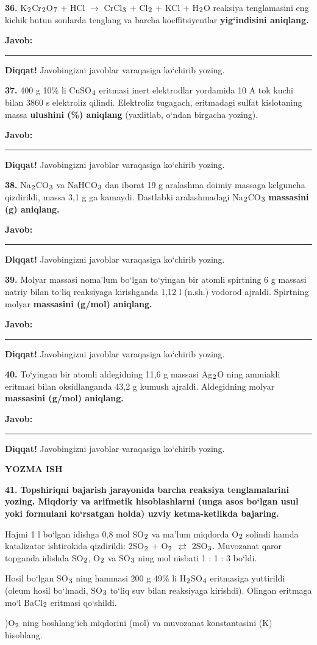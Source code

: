 \documentclass[11pt,a4paper]{article}
\renewcommand{\textsubscript}[1]{\ensuremath{_{\text{\fontsize{8}{8}\selectfont #1}}}}
\newcommand{\javob}{\par\smallskip\noindent\textbf{Javob:} \rule[-2pt]{7.5cm}{0.4pt}\par\smallskip\noindent\textbf{Diqqat!} Javobingizni javoblar varaqasiga ko`chirib yozing.\par\medskip}
\begin{document}
\par\bigskip
\noindent\textbf{36.} K\textsubscript{2}Cr\textsubscript{2}O\textsubscript{7} + HCl $\to$ CrCl\textsubscript{3} + Cl\textsubscript{2} + KCl + H\textsubscript{2}O reaksiya tenglamasini eng kichik butun sonlarda tenglang va barcha koeffitsiyentlar \textbf{yig`indisini aniqlang.}
\javob
\noindent\textbf{37.} 400 g 10\% li CuSO\textsubscript{4} eritmasi inert elektrodlar yordamida 10 A tok kuchi bilan 3860 s elektroliz qilindi. Elektroliz tugagach, eritmadagi sulfat kislotaning massa \textbf{ulushini (\%) aniqlang} (yaxlitlab, o`ndan birgacha yozing).
\javob
\noindent\textbf{38.} Na\textsubscript{2}CO\textsubscript{3} va NaHCO\textsubscript{3} dan iborat 19 g aralashma doimiy massaga kelguncha qizdirildi, massa 3,1 g ga kamaydi. Dastlabki aralashmadagi Na\textsubscript{2}CO\textsubscript{3} \textbf{massasini (g) aniqlang.}
\javob
\noindent\textbf{39.} Molyar massasi noma'lum bo`lgan to`yingan bir atomli spirtning 6 g massasi natriy bilan to`liq reaksiyaga kirishganda 1,12 l (n.sh.) vodorod ajraldi. Spirtning molyar \textbf{massasini (g/mol) aniqlang.}
\javob
\noindent\textbf{40.} To`yingan bir atomli aldegidning 11,6 g massasi Ag\textsubscript{2}O ning ammiakli eritmasi bilan oksidlanganda 43,2 g kumush ajraldi. Aldegidning molyar \textbf{massasini (g/mol) aniqlang.}
\javob
\par\bigskip\begin{center}\textbf{\fontsize{13}{15}\selectfont YOZMA ISH}\end{center}
\noindent\textbf{41.} \textbf{Topshiriqni bajarish jarayonida barcha reaksiya tenglamalarini yozing. Miqdoriy va arifmetik hisoblashlarni (unga asos bo`lgan usul yoki formulani ko`rsatgan holda) uzviy ketma-ketlikda bajaring.}\par\smallskip
Hajmi 1 l bo`lgan idishga 0,8 mol SO\textsubscript{2} va ma'lum miqdorda O\textsubscript{2} solindi hamda katalizator ishtirokida qizdirildi: 2SO\textsubscript{2} + O\textsubscript{2} $\rightleftarrows$ 2SO\textsubscript{3}. Muvozanat qaror topganda idishda SO\textsubscript{2}, O\textsubscript{2} va SO\textsubscript{3} ning mol nisbati 1 : 1 : 3 bo`ldi.\par
Hosil bo`lgan SO\textsubscript{3} ning hammasi 200 g 49\% li H\textsubscript{2}SO\textsubscript{4} eritmasiga yuttirildi (oleum hosil bo`lmadi, SO\textsubscript{3} to`liq suv bilan reaksiyaga kirishdi). Olingan eritmaga mo`l BaCl\textsubscript{2} eritmasi qo`shildi.\par
{})O\textsubscript{2} ning boshlang`ich miqdorini (mol) va muvozanat konstantasini (K) hisoblang.\par
\end{document}
